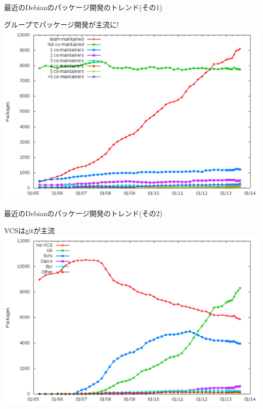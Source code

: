 \begin{frame}{最近のDebianのパッケージ開発のトレンド(その1)}
\begin{center}
\Large{グループでパッケージ開発が主流に!}\\
\includegraphics[width=0.8\hsize]{image201310/debian-dev-group.png}
\end{center}
\end{frame}

\begin{frame}{最近のDebianのパッケージ開発のトレンド(その2)}
\begin{center}
\Large{VCSはgitが主流}\\
\includegraphics[width=0.8\hsize]{image201310/debian-dev-git-major.png}
\end{center}
\end{frame}

